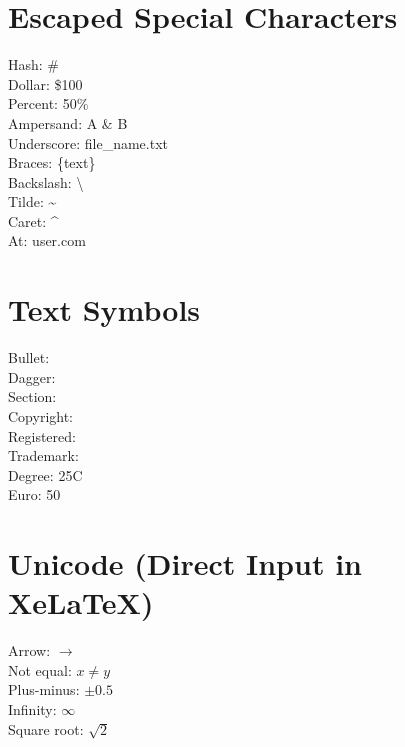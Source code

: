 \documentclass[12pt, a4paper]{article}
\begin{document}
\section*{Escaped Special Characters}
Hash: \# \\
Dollar: \$100 \\
Percent: 50\% \\
Ampersand: A \& B \\
Underscore: file\_name.txt \\
Braces: \{text\} \\
Backslash: \textbackslash \\
Tilde: \textasciitilde{} \\
Caret: \textasciicircum{} \\
At: user\@example.com

\section*{Text Symbols}
Bullet: \textbullet \\
Dagger: \textdagger \\
Section: \textsection \\
Copyright: \textcopyright \\
Registered: \textregistered \\
Trademark: \texttrademark \\
Degree: 25\textdegree{}C \\
Euro: \texteuro{}50

\section*{Unicode (Direct Input in XeLaTeX)}
Arrow: $\rightarrow$ \\
Not equal: $x \neq y$ \\
Plus-minus: $\pm 0.5$ \\
Infinity: $\infty$ \\
Square root: $\sqrt{2}$
\end{document}

